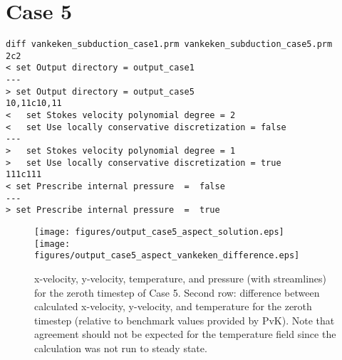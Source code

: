 \documentclass[11pt,letterpaper]{article}
\begin{document}
\section{Case 5}
\begin{verbatim}
diff vankeken_subduction_case1.prm vankeken_subduction_case5.prm
2c2
< set Output directory = output_case1
---
> set Output directory = output_case5
10,11c10,11
<   set Stokes velocity polynomial degree = 2
<   set Use locally conservative discretization = false
---
>   set Stokes velocity polynomial degree = 1
>   set Use locally conservative discretization = true
111c111
< set Prescribe internal pressure  =  false
---
> set Prescribe internal pressure  =  true
\end{verbatim}
\begin{figure}[h]
\texttt{[image: figures/output\_case5\_aspect\_solution.eps]}\\
\texttt{[image: figures/output\_case5\_aspect\_vankeken\_difference.eps]}
\caption{x-velocity, y-velocity, temperature, and pressure (with streamlines) for the zeroth timestep of Case 5. Second row: difference between calculated x-velocity, y-velocity, and temperature for the zeroth timestep (relative to benchmark values provided by PvK). Note that agreement should not be expected for the temperature field since the calculation was not run to steady state.}
\end{figure}
\end{document}
